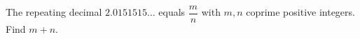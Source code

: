 The repeating decimal $2.0151515\ldots$ equals $\dfrac {m}{n}$ with $m,n$ coprime positive integers. Find $m+n$.

